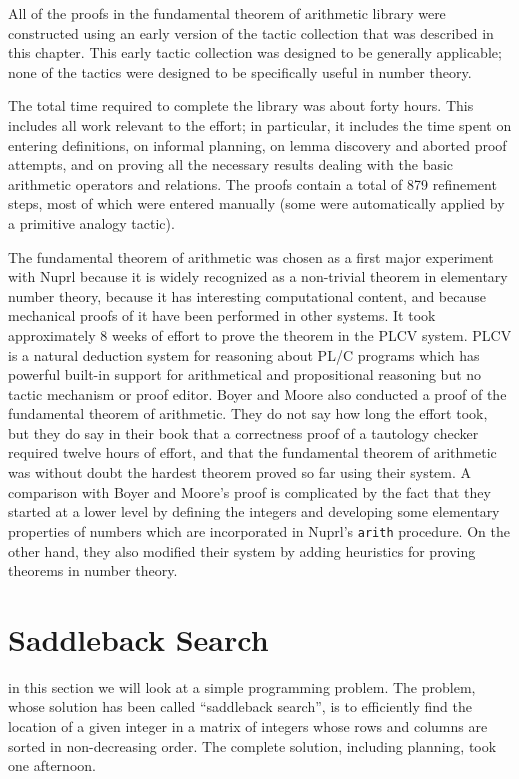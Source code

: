 All of the proofs in the fundamental theorem of arithmetic library were
constructed using an early version of the tactic collection that was
described in
this chapter.  This early tactic collection was designed to be generally
applicable; none of the tactics were designed to be specifically useful in
number theory.

The total time required to complete the library was about forty
hours.  This includes all work relevant to the effort; in particular, it
includes the time spent on entering definitions, on informal planning, on
lemma discovery and aborted proof attempts, and on proving all the necessary
results dealing with the basic arithmetic operators and relations.   
The proofs contain a total of 879 refinement
steps, most of which were entered manually (some were automatically applied
by a primitive analogy tactic).

The fundamental theorem of arithmetic was chosen as a first major experiment
with Nuprl because it is widely recognized as a non-trivial theorem in
elementary number theory, because it has interesting computational content,
and because mechanical proofs of it have been performed in other systems.  It
took approximately 8 weeks of effort to prove the theorem in the PLCV
system.  PLCV is a natural deduction system for reasoning
about PL/C programs which has powerful built-in support for arithmetical and
propositional reasoning but no tactic mechanism or proof editor.  Boyer and
Moore also conducted a proof of the fundamental theorem of
arithmetic.  They do not say how long the effort took, but they do say in
their book that a correctness proof of a tautology checker required twelve
hours of effort, and that the fundamental theorem of arithmetic was without
doubt the hardest theorem proved so far using their system.  A comparison
with Boyer and Moore's proof is complicated by the fact that they started at
a lower level by
defining the integers and developing some elementary properties of numbers
which are incorporated in Nuprl's {\tt arith}  procedure.  On the other hand,
they also modified their system by adding heuristics for proving theorems in
number theory.


\section{Saddleback Search}

in this section we will look at a simple programming problem.  The
problem, whose solution has been called ``saddleback search'', is to
efficiently find the location of a given integer in a matrix of
integers whose rows and columns are sorted in non-decreasing order.
The complete solution, including planning, took one afternoon. 

